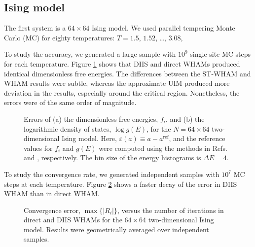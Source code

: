 \documentclass[aip,jcp,preprint,superscriptaddress]{revtex4-1}
\begin{document}
\subsection{\label{sec:results_Ising}
Ising model}





The first system is
a $64\times64$ Ising model.
%
We used parallel tempering\cite{
swendsen1986, *geyer1991, *hukushima1996, *hansmann1997, *earl2005}
Monte Carlo (MC)
for
eighty temperatures: $T = 1.5$, $1.52$, \dots, $3.08$,



To study the accuracy,
we generated a large sample with
$10^9$ single-site MC steps for each temperature.
%
Figure \ref{fig:is2ref} shows that
DIIS and direct WHAMs produced identical
dimensionless free energies.
%
The differences between the ST-WHAM and WHAM results
were subtle,
whereas the approximate UIM
produced more deviation in the results,
especially around the critical region.
%
Nonetheless,
the errors were of the same order of magnitude.



\begin{figure}[h]
  \caption{
    \label{fig:is2ref}
    Errors of
    (a) the dimensionless free energies, $f_i$, and
    (b) the logarithmic density of states, $\log g(E)$,
    for the $N = 64\times64$ two-dimensional Ising model.
    Here,
    $\varepsilon(a) \equiv a - a^\mathrm{ref}$,
    and the reference values for $f_i$ and $g(E)$
    were computed using the methods in
    Refs.  and ,
    respectively.
    The bin size of the energy histograms is $\Delta E = 4$.
  }
\end{figure}




To study the convergence rate,
we generated independent samples with
$10^7$ MC steps at each temperature.
%
Figure \ref{fig:is2trace}
shows a faster decay of the error
in DIIS WHAM
than in direct WHAM.






\begin{figure}[h]
  \caption{
    \label{fig:is2trace}
    Convergence error, $\max \{ |R_i| \}$,
    versus the number of iterations
    in direct and DIIS WHAMs
    for the $64\times64$ two-dimensional Ising model.
    Results were geometrically averaged over independent samples.
  }
\end{figure}
\end{document}
